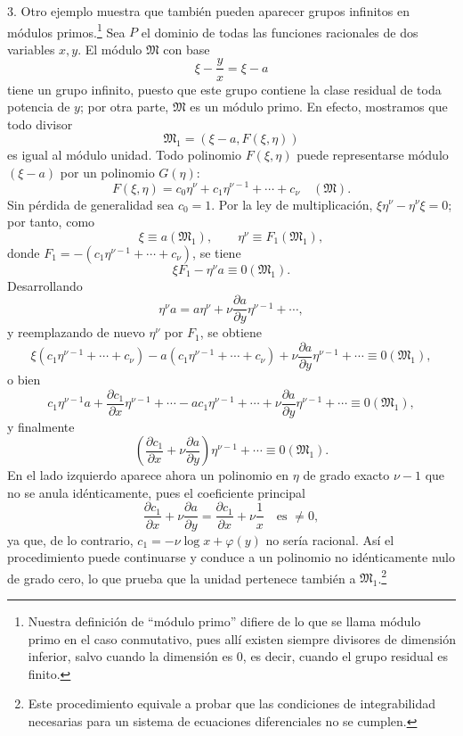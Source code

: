 3. Otro ejemplo muestra que también pueden aparecer grupos infinitos en módulos primos.\footnote{Nuestra definición de ``módulo primo'' difiere de lo que se llama módulo primo en el caso conmutativo, pues allí existen siempre divisores de dimensión inferior, salvo cuando la dimensión es $0$, es decir, cuando el grupo residual es finito.} Sea $P$ el dominio de todas las funciones racionales de dos variables $x,y$. El módulo $\mathfrak M$ con base
\[
 \xi-\frac{y}{x}=\xi-a
\]
tiene un grupo infinito, puesto que este grupo contiene la clase residual de toda potencia de $y$; por otra parte, $\mathfrak M$ es un módulo primo. En efecto, mostramos que todo divisor
\[
 \mathfrak M_1=(\xi-a,
F(\xi,\eta))
\]
es igual al módulo unidad. Todo polinomio $F(\xi,\eta)$ puede representarse módulo $(\xi-a)$ por un polinomio $G(\eta)$:
\[
 F(\xi,
\eta)=c_0\eta^\nu+c_1\eta^{\nu-1}+\cdots+c_\nu\quad(\mathfrak M).
\]
Sin pérdida de generalidad sea $c_0=1$. Por la ley de multiplicación, $\xi\eta^\nu-\eta^\nu\xi=0$; por tanto, como
\[
 \xi\equiv a(\mathfrak M_1),
 \qquad
 \eta^\nu\equiv F_1(\mathfrak M_1),
\]
donde $F_1=-(c_1\eta^{\nu-1}+\cdots+c_\nu)$, se tiene
\[
 \xi F_1-\eta^\nu a\equiv0(\mathfrak M_1).
\]
Desarrollando
\[
 \eta^\nu a=a\eta^\nu+\nu\frac{\partial a}{\partial y}\eta^{\nu-1}+\cdots,
\]
y reemplazando de nuevo $\eta^\nu$ por $F_1$, se obtiene
\[
 \xi(c_1\eta^{\nu-1}+\cdots+c_\nu)-a(c_1\eta^{\nu-1}+\cdots+c_\nu)
 +\nu\frac{\partial a}{\partial y}\eta^{\nu-1}+\cdots\equiv0(\mathfrak M_1),
\]
o bien
\[
 c_1\eta^{\nu-1}a+\frac{\partial c_1}{\partial x}\eta^{\nu-1}+\cdots
 -ac_1\eta^{\nu-1}+\cdots+
\nu\frac{\partial a}{\partial y}\eta^{\nu-1}+\cdots
 \equiv0(\mathfrak M_1),
\]
y finalmente
\[
 \left(\frac{\partial c_1}{\partial x}+\nu\frac{\partial a}{\partial y}\right)\eta^{\nu-1}+\cdots
 \equiv0(\mathfrak M_1).
\]
En el lado izquierdo aparece ahora un polinomio en $\eta$ de grado exacto $\nu-1$ que no se anula idénticamente, pues el coeficiente principal
\[
 \frac{\partial c_1}{\partial x}+\nu\frac{\partial a}{\partial y}
 =\frac{\partial c_1}{\partial x}+\nu\frac{1}{x}
 \quad\text{es }\ne0,
\]
ya que, de lo contrario, $c_1=-\nu\log x+\varphi(y)$ no sería racional. Así el procedimiento puede continuarse y conduce a un polinomio no idénticamente nulo de grado cero, lo que prueba que la unidad pertenece también a $\mathfrak M_1$.\footnote{Este procedimiento equivale a probar que las condiciones de integrabilidad necesarias para un sistema de ecuaciones diferenciales no se cumplen.}

